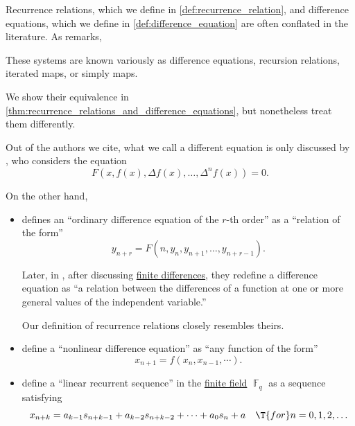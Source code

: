 \begin{remark}\label{rem:recurrence_relations_and_difference_equations_literature_overview}
  Recurrence relations, which we define in \cref{def:recurrence_relation}, and difference equations, which we define in \cref{def:difference_equation} are often conflated in the literature. As \textcite{Strogatz1994NonlinearDynamics} remarks,
  \begin{displayquote}
    These systems are known variously as difference equations, recursion relations, iterated maps, or simply maps.
  \end{displayquote}

  We show their equivalence in \cref{thm:recurrence_relations_and_difference_equations}, but nonetheless treat them differently.

  Out of the authors we cite, what we call a different equation is only discussed by \textcite[307]{Гельфонд1959ИсчислениеКонечныхРазностей}, who considers the equation
  \begin{equation*}
    F(x, f(x), \Delta f(x), \ldots, \Delta^n f(x)) = 0.
  \end{equation*}

  On the other hand,
  \begin{itemize}
    \item \Textcite[3]{LevyLessman1961FiniteDifferenceEquations} defines an \enquote{ordinary difference equation of the \( r \)-th order} as a \enquote{relation of the form}
    \begin{equation*}
      y_{n+r} = F(n, y_n, y_{n+1}, \ldots, y_{n+r-1}).
    \end{equation*}

    Later, in \cite[75]{LevyLessman1961FiniteDifferenceEquations}, after discussing \hyperref[def:finite_difference_operator]{finite differences}, they redefine a difference equation as \enquote{a relation between the differences of a function at one or more general values of the independent variable.}

    Our definition of recurrence relations closely resembles theirs.

    \item \Textcite[40]{EdelsteinKeshet2005MathematicalModelsInBiology} define a \enquote{nonlinear difference equation} as \enquote{any function of the form}
    \begin{equation*}
      x_{n+1} = f(x_n, x_{n-1}, \cdots).
    \end{equation*}

    \item \Textcite[395]{LidlNiederreiter1997FiniteFields} define a \enquote{linear recurrent sequence} in the \hyperref[def:finite_field]{finite field} \( \BbbF_q \) as a sequence satisfying
    \begin{equation*}
      x_{n+k} = a_{k-1} s_{n+k-1} + a_{k-2} s_{n+k-2} + \cdots + a_0 s_n + a \quad\T{for} n = 0, 1, 2, \ldots
    \end{equation*}


\end{itemize}
\end{remark}
